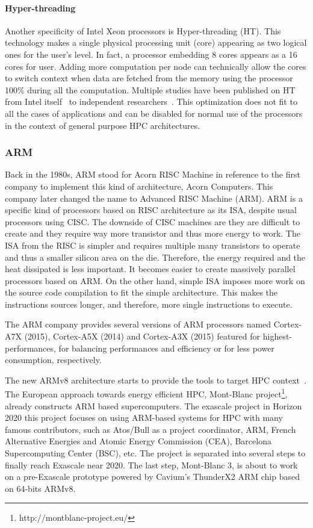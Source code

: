 \paragraph{Hyper-threading}
Another specificity of Intel Xeon processors is Hyper-threading (HT). 
This technology makes a single physical processing unit (core) appearing as two logical ones for the user's level.
In fact, a processor embedding 8 cores appears as a 16 cores for user. 
Adding more computation per node can technically allow the cores to switch context when data are fetched from the memory using the processor 100\% during all the computation. 
Multiple studies have been published on HT from Intel itself~\cite{marr2002hyperthreading} to independent researchers~\cite{bononi2006exploring,leng2002empirical}.
This optimization does not fit to all the cases of applications and can be disabled for normal use of the processors in the context of general purpose HPC architectures.

\subsubsection{ARM}
Back in the 1980s, ARM stood for Acorn RISC Machine in reference to the first company to implement this kind of architecture, Acorn Computers. 
This company later changed the name to Advanced RISC Machine (ARM). 
ARM is a specific kind of processors based on RISC architecture as its ISA, despite usual processors using CISC.
The downside of CISC machines are they are difficult to create and they require way more transistor and thus more energy to work. 
The ISA from the RISC is simpler and requires multiple many transistors to operate and thus a smaller silicon area on the die.
Therefore, the energy required and the heat dissipated is less important. 
It becomes easier to create massively parallel processors based on ARM. 
On the other hand, simple ISA imposes more work on the source code compilation to fit the simple architecture. 
This makes the instructions sources longer, and therefore, more single instructions to execute. 

The ARM company provides several versions of ARM processors named Cortex-A7X (2015), Cortex-A5X (2014) and Cortex-A3X (2015) featured for highest-performances, for balancing performances and efficiency or for less power consumption, respectively. 

The new ARMv8 architecture starts to provide the tools to target HPC context~\cite{rico2017arm}.
The European approach towards energy efficient HPC, Mont-Blanc project\footnote{http://montblanc-project.eu/}, already constructs ARM based supercomputers. 
The exascale project in Horizon 2020 this project focuses on using ARM-based systems for HPC with many famous contributors, such as Atos/Bull as a project coordinator, ARM, French Alternative Energies and Atomic Energy Commission (CEA), Barcelona Supercomputing Center (BSC), etc.
The project is separated into several steps to finally reach Exascale near 2020. 
The last step, Mont-Blanc 3, is about to work on a pre-Exascale prototype powered by Cavium’s ThunderX2 ARM chip based on 64-bits ARMv8.

